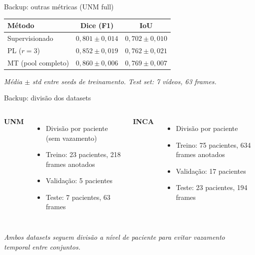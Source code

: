 \documentclass[aspectratio=169]{beamer}
\begin{document}
\begin{frame}{Backup: outras métricas (UNM full)}
  \centering
  \footnotesize
  \begin{tabular}{@{}lcc@{}}
    \toprule
    \textbf{Método}    & \textbf{Dice (F1)}    & \textbf{IoU}      \\
    \midrule
    Supervisionado     & $0,801 \pm 0,014$     & $0,702 \pm 0,010$ \\
    PL ($r{=}3$)       & $0,852 \pm 0,019$     & $0,762 \pm 0,021$ \\
    MT (pool completo) & $0,860 \pm 0,006$     & $0,769 \pm 0,007$ \\
    \bottomrule
  \end{tabular}

  \vspace{1em}
  \footnotesize
  \textit{Média $\pm$ std entre seeds de treinamento. Test set: 7 vídeos, 63 frames.}
\end{frame}


\begin{frame}{Backup: divisão dos datasets}
  \begin{columns}[T,totalwidth=\textwidth]
      \textbf{UNM}
      \begin{itemize}
        \item Divisão por paciente (sem vazamento)
        \item Treino: 23 pacientes, 218 frames anotados
        \item Validação: 5 pacientes
        \item Teste: 7 pacientes, 63 frames
      \end{itemize}

      \textbf{INCA}
      \begin{itemize}
        \item Divisão por paciente
        \item Treino: 75 pacientes, 634 frames anotados
        \item Validação: 17 pacientes
        \item Teste: 23 pacientes, 194 frames
      \end{itemize}
  \end{columns}

  \vspace{1em}
  \footnotesize
  \textit{Ambos datasets seguem divisão a nível de paciente para evitar vazamento temporal entre conjuntos.}
\end{frame}
\end{document}
